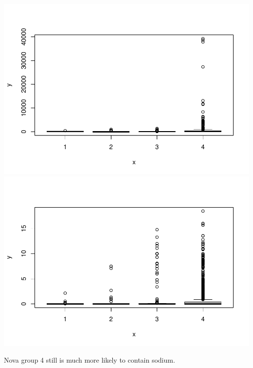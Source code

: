 \documentclass[
]{article}
\begin{document}
\includegraphics{upfsnutrient_files/figure-latex/unnamed-chunk-3-2.pdf}
\includegraphics{upfsnutrient_files/figure-latex/unnamed-chunk-3-3.pdf}

Nova group 4 still is much more likely to contain sodium.
\end{document}
